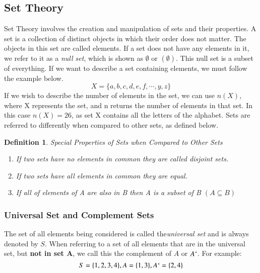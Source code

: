 \documentclass[final,1p,12pt]{elsarticle}
\newtheorem{definition}{Definition}
\begin{document}
    \subsection{Set Theory}
    Set Theory involves the creation and manipulation of sets and their properties. A set is a collection of distinct objects in which their order does not matter. The objects in this set are called elements. If a set does not have any elements in it, we refer to it as a \emph{null set}, which is shown as $\emptyset$ or $(\emptyset)$. This null set is a subset of everything. If we want to describe a set containing elements, we must follow the example below.
    \begin{equation}
        X = \{a,b,c,d,e,f,\cdots,y,z\}
    \end{equation}
    If we wish to describe the number of elements in the set, we can use $n(X)$, where X represents the set, and n returns the number of elements in that set. In this case $n(X) = 26$, as set X contains all the letters of the alphabet. Sets are referred to differently when compared to other sets, as defined below.
    \begin{definition}
    Special Properties of Sets when Compared to Other Sets
    \begin{enumerate}
        \item If two sets have no elements in common they are called disjoint sets.
        \item If two sets have all elements in common they are equal.
        \item If all of elements of A are also in B then A is a subset of B $(A\subseteq B)$
    \end{enumerate}
    \end{definition}
    
        \subsubsection{Universal Set and Complement Sets}
        The set of all elements being considered is called the\emph{universal set} and is always denoted by $S$. When referring to a set of all elements that are in the universal set, but\textbf{ not in set A}, we call this the complement of $A$ or $A`$. For example:
        \begin{equation}
            S = \{1,2,3,4\}, A = \{1,3\}, A`=\{2,4\}
        \end{equation}
        
\end{document}
